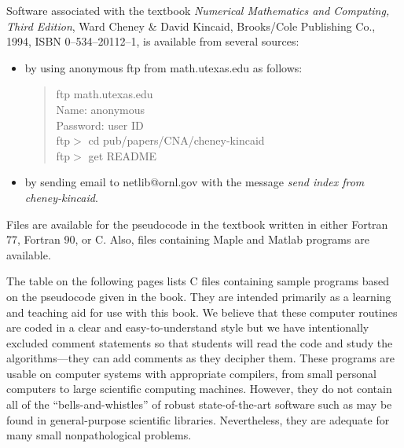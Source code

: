 

Software associated with the textbook 
{\em Numerical Mathematics and Computing, Third Edition},
Ward Cheney \& David Kincaid, Brooks/Cole Publishing Co.,
1994, ISBN 0--534--20112--1, is available from several sources:

\begin{itemize}
\item
by using anonymous ftp from math.utexas.edu as follows:

\begin{verse}
ftp math.utexas.edu\\
Name: anonymous\\
Password: user ID\\
ftp$>$ cd pub/papers/CNA/cheney-kincaid\\
ftp$>$ get README 
\end{verse}

\item
 by sending email to netlib@ornl.gov
with the message {\em send index from cheney-kincaid}.
\end{itemize}

Files are available for the pseudocode in the textbook
written in either Fortran 77, Fortran 90, or C.
Also, files containing Maple and Matlab programs are available.

The table on the following pages lists C
files containing sample programs 
based on the pseudocode given in the book.
They are intended  primarily as a learning and teaching aid 
for use with this book.
We believe that these computer routines are coded in a clear and
easy-to-understand style but we
have intentionally excluded comment statements 
so that students will read the code and study the algorithms---they
can add comments as they decipher them.
These programs are usable on computer systems with appropriate 
compilers, from
small personal computers to large scientific computing machines.
However, they do not contain all of the ``bells-and-whistles'' of
robust state-of-the-art software such as may be found in general-purpose
scientific libraries.
Nevertheless, they are adequate for many small nonpathological
problems.

